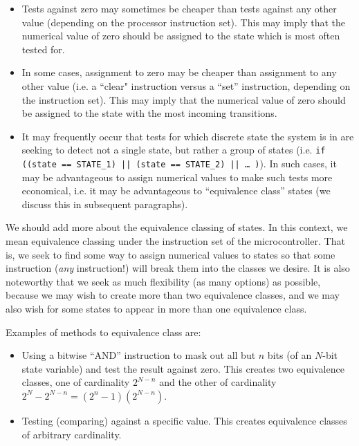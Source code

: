 \begin{itemize}
\item Tests against zero may sometimes be cheaper than
      tests against any other value (depending on the processor
      instruction set).  This may imply that the numerical value
      of zero should be assigned to the state which is most
      often tested for.
\item In some cases, assignment to zero may be cheaper than
      assignment to any other value (i.e. a ``clear" instruction
      versus a ``set'' instruction, depending on the instruction
      set).  This may imply that 
      the numerical value of zero should be assigned to the
      state with the most incoming transitions.
\item It may frequently occur that tests for which discrete
      state the system is in are seeking to detect
      not a single state, but rather a group of states (i.e.
      \texttt{if ((state == STATE\_1) || (state == STATE\_2) || \ldots{} )}).
      In such cases, it may be advantageous to assign numerical values
      to make such tests more economical, i.e. it may be advantageous
      to ``equivalence class'' states (we discuss this in subsequent
      paragraphs).
\end{itemize}

We should add more about the equivalence classing of states.  In this
context, we mean equivalence classing under the instruction set of the
microcontroller.  That is, we seek to find some way to assign numerical
values to states so that some instruction (\emph{any} instruction!) will
break them into the classes we desire.  It is also noteworthy that we seek
as much flexibility (as many options) as possible, because we may wish to
create more than two equivalence classes, and we may also
wish for some states to appear in more than one equivalence class.

Examples of methods to equivalence class are:

\begin{itemize}
\item Using a bitwise ``AND'' instruction to mask out all
      but $n$ bits (of an $N$-bit state variable)
      and test the result
      against zero.  This creates two equivalence
      classes, one of cardinality $2^{N-n}$ 
      and the other of cardinality 
      $2^N - 2^{N-n} = (2^n - 1)(2^{N-n})$.
\item Testing (comparing) against a specific value.  This creates
      equivalence classes of arbitrary cardinality.
\end{itemize}




